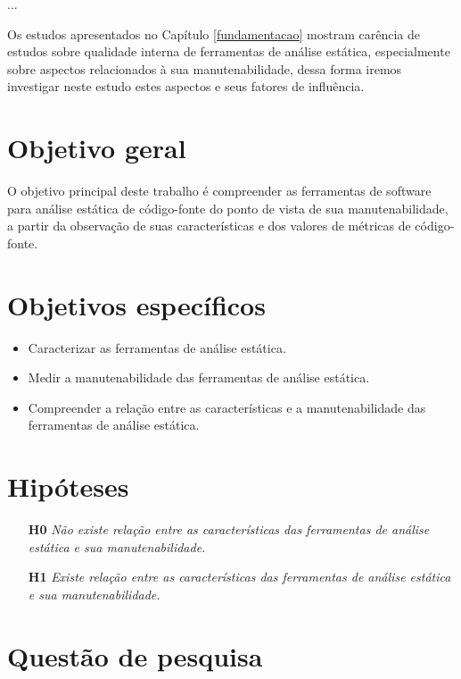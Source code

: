 {...}
\label{planejamento}

Os estudos apresentados no Capítulo \ref{fundamentacao} mostram carência de
estudos sobre qualidade interna de ferramentas de análise estática,
especialmente sobre aspectos relacionados à sua manutenabilidade, dessa forma
iremos investigar neste estudo estes aspectos e seus fatores de influência.


\section{Objetivo geral}

O objetivo principal deste trabalho é compreender as ferramentas de software
para análise estática de código-fonte do ponto de vista de sua
manutenabilidade, a partir da observação de suas características e dos valores
de métricas de código-fonte.

\section{Objetivos específicos}

\begin{itemize}
  \item Caracterizar as ferramentas de análise estática.
  \item Medir a manutenabilidade das ferramentas de análise estática.
  \item Compreender a relação entre as características e a manutenabilidade
        das ferramentas de análise estática.
\end{itemize}

\section{Hipóteses} \label{hipoteses}

\begin{enumerate}
  \item[{\bf H0}] {\em Não existe relação entre as características das
  ferramentas de análise estática e sua manutenabilidade.}
  \item[{\bf H1}] {\em Existe relação entre as características das ferramentas
  de análise estática e sua manutenabilidade.}
\end{enumerate}

\section{Questão de pesquisa}

